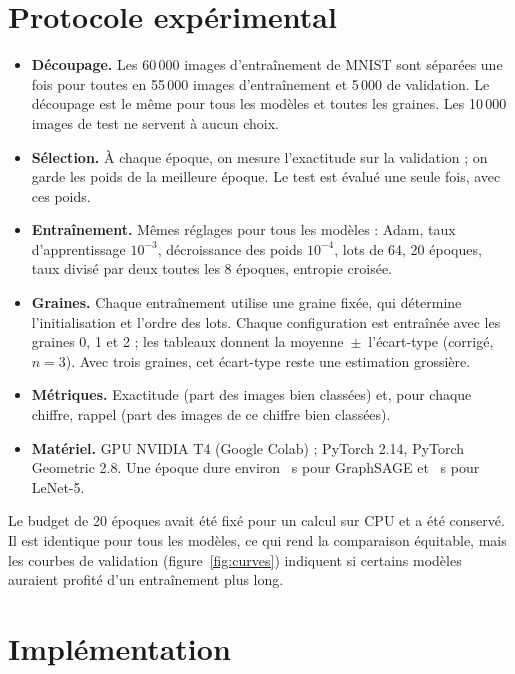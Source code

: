 \documentclass[11pt,a4paper]{article}
\newcommand{\pmv}{\,\ensuremath{\pm}\,}
\begin{document}
\section{Protocole expérimental}
\label{sec:protocol}

\begin{itemize}
  \item \textbf{Découpage.} Les 60\,000 images d'entraînement de MNIST sont séparées une fois pour toutes en
  55\,000 images d'entraînement et 5\,000 de validation. Le découpage est le même pour tous les modèles et toutes les
  graines. Les 10\,000 images de test ne servent à aucun choix.
  \item \textbf{Sélection.} À chaque époque, on mesure l'exactitude sur la validation ; on garde les poids de la
  meilleure époque. Le test est évalué une seule fois, avec ces poids.
  \item \textbf{Entraînement.} Mêmes réglages pour tous les modèles : Adam, taux d'apprentissage $10^{-3}$, décroissance
  des poids $10^{-4}$, lots de 64, 20 époques, taux divisé par deux toutes les 8 époques, entropie croisée.
  \item \textbf{Graines.} Chaque entraînement utilise une graine fixée, qui détermine l'initialisation et l'ordre
  des lots. Chaque configuration est entraînée avec les graines 0, 1 et 2 ; les tableaux donnent la moyenne
  \pmv{} l'écart-type (corrigé, $n = 3$). Avec trois graines, cet écart-type reste une estimation grossière.
  \item \textbf{Métriques.} Exactitude (part des images bien classées) et, pour chaque chiffre, rappel (part des images
  de ce chiffre bien classées).
  \item \textbf{Matériel.} GPU NVIDIA T4 (Google Colab) ; PyTorch 2.14, PyTorch Geometric 2.8. Une époque dure
  environ \secsage~s pour GraphSAGE et \seclenet~s pour LeNet-5.
\end{itemize}

Le budget de 20 époques avait été fixé pour un calcul sur CPU et a été conservé. Il est identique pour tous les modèles, ce qui rend la
comparaison équitable, mais les courbes de validation (figure~\ref{fig:curves}) indiquent si certains modèles auraient
profité d'un entraînement plus long.

\section{Implémentation}
\end{document}
